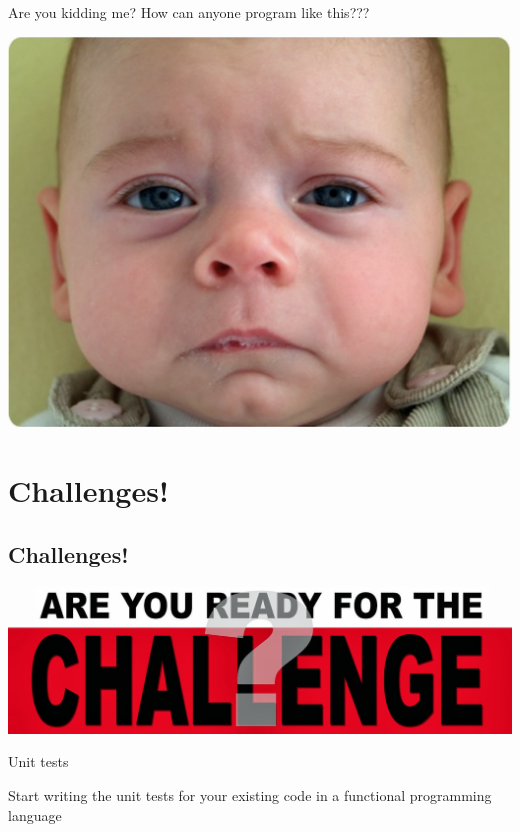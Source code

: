 \documentclass[mathserif]{beamer}
\begin{document}
\begin{frame}{Are you kidding me?}
  How can anyone program like this???
  \begin{center}
    \includegraphics[scale=0.3]{img/sadbaby.png}
  \end{center}
\end{frame}

\section{Challenges!}
\subsection{Challenges!}

\begin{frame}
  \begin{center}
    \includegraphics[scale=0.2]{img/AreYouReadyfortheChallenge.jpg}
  \end{center}
\end{frame}

\begin{frame}{Unit tests}

  \begin{center}
    {\Huge Start writing the unit tests for your existing code in a functional programming language}
  \end{center}

\end{frame}
\end{document}
